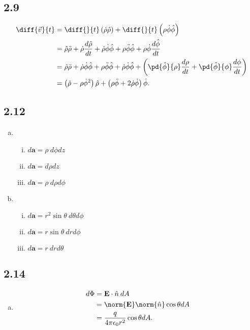 \documentclass[10pt]{mypackage}
\begin{document}
\subsection{2.9}%
\begin{align*}
  \diff{\vec{v}}{t} &= \diff{}{t}\left(\dot{\rho}\hat\rho\right) + \diff{}{t}\left(\rho\dot\phi\hat\phi\right)\\
                    &= \hat{\rho}\ddot{\rho} + \dot\rho\frac{d\hat\rho}{dt} + \dot\rho\dot\phi\hat{\phi} + \rho\ddot\phi\hat\phi + \rho\dot\phi\frac{d\hat{\phi}}{dt}\\
                    &= \hat\rho\ddot\rho + \dot\rho\dot{\phi}\hat\phi + \rho\ddot\phi\hat\phi + \dot\rho\dot\phi\hat\phi + \left(\pd{\hat\phi}{\rho}\frac{d\rho}{dt} + \pd{\hat\phi}{\phi}\frac{d\phi}{dt}\right)\\
                    &= \left(\ddot\rho - \rho\dot\phi^2\right) \hat{\rho} + \left(\rho\ddot\phi + 2\dot\rho\dot\phi\right)\hat{\phi}.
\end{align*}
\subsection{2.12}%
\begin{enumerate}[(a)]
  \item \hfill
    \begin{enumerate}[(i)]
      \item $d\mathbf{a} = \rho\:d\phi dz$
      \item $d\mathbf{a} = d\rho dz$
      \item $d \mathbf{a} = \rho\:d\rho d\phi$
    \end{enumerate}
  \item \hfill
    \begin{enumerate}[(i)]
      \item $d\mathbf{a} = r^2\sin \theta\:d\theta d\phi$
      \item $d\mathbf{a} = r \sin \theta\:dr d\phi$
      \item $d\mathbf{a} = r\:drd\theta$
    \end{enumerate}
\end{enumerate}
\subsection{2.14}%
\begin{enumerate}[(a)]
  \item 
    \begin{align*}
      d\Phi &= \mathbf{E}\cdot \hat{n}\: dA\\
            &= \norm{\mathbf{E}}\norm{\hat{n}}\cos\theta dA\\
            &= \frac{q}{4\pi\epsilon_0 r^2}\cos\theta dA.
    \end{align*}
\end{enumerate}
\end{document}
